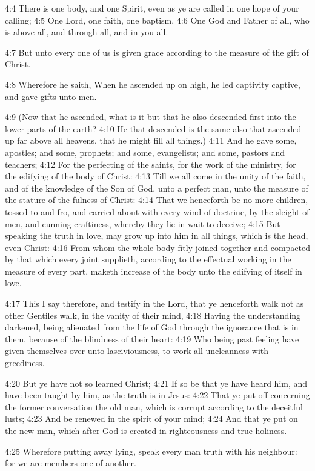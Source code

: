 4:4 There is one body, and one Spirit, even as ye are called in one
hope of your calling; 4:5 One Lord, one faith, one baptism, 4:6 One
God and Father of all, who is above all, and through all, and in you
all.

4:7 But unto every one of us is given grace according to the measure
of the gift of Christ.

4:8 Wherefore he saith, When he ascended up on high, he led captivity
captive, and gave gifts unto men.

4:9 (Now that he ascended, what is it but that he also descended first
into the lower parts of the earth?  4:10 He that descended is the same
also that ascended up far above all heavens, that he might fill all
things.)  4:11 And he gave some, apostles; and some, prophets; and
some, evangelists; and some, pastors and teachers; 4:12 For the
perfecting of the saints, for the work of the ministry, for the
edifying of the body of Christ: 4:13 Till we all come in the unity of
the faith, and of the knowledge of the Son of God, unto a perfect man,
unto the measure of the stature of the fulness of Christ: 4:14 That we
henceforth be no more children, tossed to and fro, and carried about
with every wind of doctrine, by the sleight of men, and cunning
craftiness, whereby they lie in wait to deceive; 4:15 But speaking the
truth in love, may grow up into him in all things, which is the head,
even Christ: 4:16 From whom the whole body fitly joined together and
compacted by that which every joint supplieth, according to the
effectual working in the measure of every part, maketh increase of the
body unto the edifying of itself in love.

4:17 This I say therefore, and testify in the Lord, that ye henceforth
walk not as other Gentiles walk, in the vanity of their mind, 4:18
Having the understanding darkened, being alienated from the life of
God through the ignorance that is in them, because of the blindness of
their heart: 4:19 Who being past feeling have given themselves over
unto lasciviousness, to work all uncleanness with greediness.

4:20 But ye have not so learned Christ; 4:21 If so be that ye have
heard him, and have been taught by him, as the truth is in Jesus: 4:22
That ye put off concerning the former conversation the old man, which
is corrupt according to the deceitful lusts; 4:23 And be renewed in
the spirit of your mind; 4:24 And that ye put on the new man, which
after God is created in righteousness and true holiness.

4:25 Wherefore putting away lying, speak every man truth with his
neighbour: for we are members one of another.


